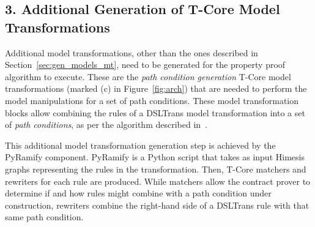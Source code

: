 





\subsection*{3. Additional Generation of T-Core Model Transformations}

Additional model transformations, other than the ones described in
Section~\ref{sec:gen_models_mt}, need to be generated for the property proof
algorithm to execute. These are the \emph{path condition generation} T-Core
model transformations (marked (c) in Figure~\ref{fig:arch}) that are needed to
perform the model manipulations for a set of path conditions. These model
transformation blocks allow combining the rules of a DSLTrans model
transformation into a set of \emph{path conditions}, as per the algorithm
described in~\cite{Lucio2014}.

This additional model transformation generation step is achieved by the PyRamify
component. PyRamify is a Python script that takes as input Himesis graphs
representing the rules in the transformation. Then, T-Core matchers and
rewriters for each rule are produced. While matchers allow the contract prover to determine
if and how rules might combine with a path condition under construction,
rewriters combine the right-hand side of a DSLTrans rule with that same path
condition.

